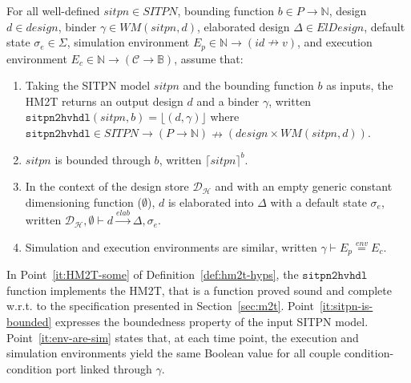 \begin{definition}[HM2T hypotheses]
  \label{def:hm2t-hyps}
  For all well-defined $sitpn\in{}SITPN$, bounding function
  $b\in{}P\rightarrow\mathbb{N}$, \hvhdl{} design $d\in{}design$,
  binder $\gamma\in{}WM(sitpn,d)$, elaborated design
  $\Delta\in{}ElDesign$, default state $\sigma_e\in\Sigma$, simulation
  environment $E_p\in\mathbb{N}\rightarrow{}(id\nrightarrow{}v)$, and
  execution environment
  $E_c\in\mathbb{N}\rightarrow(\mathcal{C}\rightarrow\mathbb{B})$,
  assume that:
  \begin{enumerate}
  \item\label{it:HM2T-some} Taking the SITPN model $sitpn$ and the
    bounding function $b$ as inputs, the HM2T returns an output design
    $d$ and a binder $\gamma$, written
    $\mathtt{sitpn2hvhdl}(sitpn, b)=\lfloor(d,\gamma)\rfloor$ where
    $\mathtt{sitpn2hvhdl}\in{}SITPN\rightarrow(P\rightarrow\mathbb{N})\nrightarrow(design\times{}WM(sitpn,d))$.
  \item\label{it:sitpn-is-bounded} $sitpn$ is bounded through $b$,
    written $\lceil{}sitpn\rceil^b$.
  \item In the context of the \hilecop{} design store
    $\mathcal{D}_\mathcal{H}$ and with an empty generic constant
    dimensioning function ($\emptyset$), $d$ is elaborated into
    $\Delta$ with a default state $\sigma_e$, written
    $\mathcal{D}_\mathcal{H},\emptyset\vdash{}d\xrightarrow{elab}\Delta,\sigma_e$.
  \item\label{it:env-are-sim} Simulation and execution environments
    are similar, written $\gamma\vdash{}E_p\stackrel{env}{=}E_c$.
  \end{enumerate}
  
\end{definition}

In Point~\ref{it:HM2T-some} of Definition~\ref{def:hm2t-hyps}, the
$\mathtt{sitpn2hvhdl}$ function implements the HM2T, that is a
function proved sound and complete w.r.t. to the specification
presented in Section~\ref{sec:m2t}. Point~\ref{it:sitpn-is-bounded}
expresses the boundedness property of the input SITPN
model. Point~\ref{it:env-are-sim} states that, at each time point, the
execution and simulation environments yield the same Boolean value for
all couple condition-condition port linked through $\gamma$.

\def\hm2thyps{well-defined $sitpn\in{}SITPN$,
  $b\in{}P\rightarrow\mathbb{N}$, $d\in{}design$,
  $\gamma\in{}WM(sitpn,d)$, $\Delta\in{}ElDesign,\sigma_{e}\in\Sigma$,
  $E_p\in\mathbb{N}\rightarrow{}(id\nrightarrow{}v)$, and
  $E_c\in\mathbb{N}\rightarrow(\mathcal{C}\rightarrow\mathbb{B})$ that
  verify the hypotheses of Definition~\ref{def:hm2t-hyps}}

